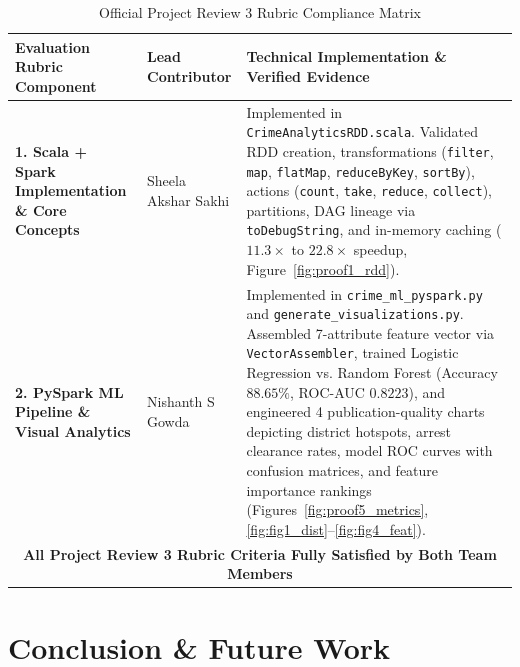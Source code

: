 \documentclass[11pt,a4paper]{article}
\begin{document}
\begin{table}[H]
    \centering
    \small
    \renewcommand{\arraystretch}{1.2}
    \caption{Official Project Review 3 Rubric Compliance Matrix}
    \label{tab:rubric_verification}
    \begin{tabular}{p{5.5cm}p{3.0cm}p{6.8cm}}
        \toprule
        \textbf{Evaluation Rubric Component} & \textbf{Lead Contributor} & \textbf{Technical Implementation \& Verified Evidence} \\
        \midrule
        \textbf{1. Scala + Spark Implementation \& Core Concepts} & Sheela Akshar Sakhi & 
        Implemented in \texttt{CrimeAnalyticsRDD.scala}. Validated RDD creation, transformations (\texttt{filter}, \texttt{map}, \texttt{flatMap}, \texttt{reduceByKey}, \texttt{sortBy}), actions (\texttt{count}, \texttt{take}, \texttt{reduce}, \texttt{collect}), partitions, DAG lineage via \texttt{toDebugString}, and in-memory caching ($11.3\times$ to $22.8\times$ speedup, Figure~\ref{fig:proof1_rdd}). \\
        \midrule
        \textbf{2. PySpark ML Pipeline \& Visual Analytics} & Nishanth S Gowda & 
        Implemented in \texttt{crime\_ml\_pyspark.py} and \texttt{generate\_visualizations.py}. Assembled 7-attribute feature vector via \texttt{VectorAssembler}, trained Logistic Regression vs. Random Forest (Accuracy $88.65\%$, ROC-AUC $0.8223$), and engineered 4 publication-quality charts depicting district hotspots, arrest clearance rates, model ROC curves with confusion matrices, and feature importance rankings (Figures~\ref{fig:proof5_metrics}, \ref{fig:fig1_dist}--\ref{fig:fig4_feat}). \\
        \midrule
        \multicolumn{3}{c}{\textbf{All Project Review 3 Rubric Criteria Fully Satisfied by Both Team Members}} \\
        \bottomrule
    \end{tabular}
\end{table}

\section{Conclusion \& Future Work}
\end{document}
